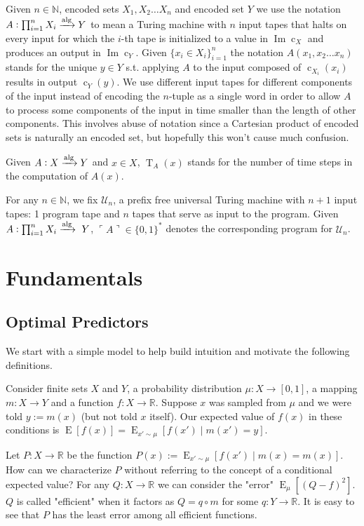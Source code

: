 \documentclass{article}
\numberwithin{equation}{section}
\theoremstyle{definition}
\theoremstyle{plain}
\newcommand{\Bool}{\{0,1\}}
\newcommand{\Words}{{\Bool^*}}
\DeclareMathOperator{\Img}{Im}
\DeclareMathOperator{\E}{E}
\DeclareMathOperator{\T}{T}
\DeclareMathOperator{\En}{c}
\newcommand{\Nats}{\mathbb{N}}
\newcommand{\Reals}{\mathbb{R}}
\newcommand{\Quote}[1]{\ulcorner #1 \urcorner}
\newcommand{\Alg}{\xrightarrow{\textnormal{alg}}}
\begin{document}
Given $n \in \Nats$, encoded sets $X_1, X_2 \ldots X_n$ and encoded set $Y$ we use the notation $A: \prod_{i=1}^n X_i \Alg Y$ to mean a Turing machine with $n$ input tapes that halts on every input for which the $i$-th tape is initialized to a value in $\Img \En_X$ and produces an output in $\Img \En_Y$. Given $\{x_i \in X_i\}_{i=1}^n$ the notation $A(x_1, x_2 \ldots x_n)$ stands for the unique $y \in Y$ s.t. applying $A$ to the input composed of $\En_{X_i}(x_i)$ results in output $\En_Y(y)$. We use different input tapes for different components of the input instead of encoding the $n$-tuple as a single word in order to allow $A$ to process some components of the input in time smaller than the length of other components. This involves abuse of notation since a Cartesian product of encoded sets is naturally an encoded set, but hopefully this won't cause much confusion.

Given $A: X \Alg Y$ and $x \in X$, $\T_A(x)$ stands for the number of time steps in the computation of $A(x)$.

For any $n \in \Nats$, we fix $\mathcal{U}_n$, a prefix free universal Turing machine with $n+1$ input tapes: 1 program tape and $n$ tapes that serve as input to the program. Given $A: \prod_{i=1}^n X_i \Alg\ Y$, $\Quote{A} \in \Words$ denotes the corresponding program for $\mathcal{U}_n$.

\section{Fundamentals}
\label{sec:fundamentals}

\subsection{Optimal Predictors}

We start with a simple model to help build intuition and motivate the following definitions.

Consider finite sets $X$ and $Y$, a probability distribution $\mu: X \rightarrow [0,1]$, a mapping $m: X \rightarrow Y$ and a function $f: X \rightarrow \Reals$. Suppose $x$ was sampled from $\mu$ and we were told $y := m(x)$ (but not told $x$ itself). Our expected value of $f(x)$ in these conditions is $\E[f(x)] = \E_{x' \sim \mu}[f(x') \mid m(x') = y]$.

Let $P: X \rightarrow \Reals$ be the function $P(x) := \E_{x' \sim \mu}[f(x') \mid m(x) = m(x)]$. How can we characterize $P$ without referring to the concept of a conditional expected value? For any $Q: X \rightarrow \Reals$ we can consider the "error" $\E_\mu[(Q - f)^2]$. $Q$ is called "efficient" when it factors as $Q = q \circ m$ for some $q: Y \rightarrow \Reals$. It is easy to see that $P$ has the least error among all efficient functions.
\end{document}
